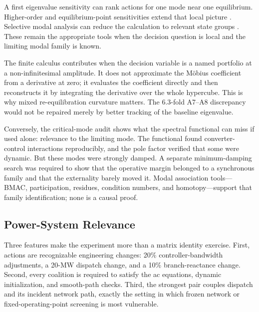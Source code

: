 A first eigenvalue sensitivity can rank actions for one mode near one
equilibrium. Higher-order and equilibrium-point sensitivities extend that
local picture \cite{nam2000eigensensitivity,zamoracardenas2013multiparameter}.
Selective modal analysis can reduce the calculation to relevant state groups
\cite{perezarriaga1982sma}. These remain the appropriate tools when the
decision question is local and the limiting modal family is known.

The finite calculus contributes when the decision variable is a named
portfolio at a non-infinitesimal amplitude. It does not approximate the
M\"obius coefficient from a derivative at zero; it evaluates the coefficient
directly and then reconstructs it by integrating the derivative over the
whole hypercube. This is why mixed re-equilibration curvature matters. The
6.3-fold A7--A8 discrepancy would not be repaired merely by better tracking of
the baseline eigenvalue.

Conversely, the critical-mode audit shows what the spectral functional can
miss if used alone: relevance to the limiting mode. The functional found
converter-control interactions reproducibly, and the pole factor verified
that some were dynamic. But these modes were strongly damped. A separate
minimum-damping search was required to show that the operative margin belonged
to a synchronous family and that the externality barely moved it. Modal
association tools---BMAC, participation, residues, condition numbers, and
homotopy---support that family identification; none is a causal proof.

\subsection{Power-System Relevance}

Three features make the experiment more than a matrix identity exercise.
First, actions are recognizable engineering changes: 20\% controller-bandwidth
adjustments, a 20-MW dispatch change, and a 10\% branch-reactance change.
Second, every coalition is required to satisfy the ac equations, dynamic
initialization, and smooth-path checks. Third, the strongest pair couples
dispatch and its incident network path, exactly the setting in which frozen
network or fixed-operating-point screening is most vulnerable.

